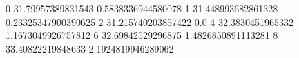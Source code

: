 0 31.79957389831543 0.5838336944580078
1 31.448993682861328 0.23325347900390625
2 31.215740203857422 0.0
4 32.3830451965332 1.1673049926757812
6 32.69842529296875 1.4826850891113281
8 33.40822219848633 2.1924819946289062
